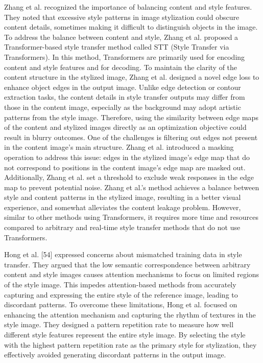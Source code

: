 Zhang et al.\citep{53zhang2023edge} recognized the importance of balancing content and style features. They noted that excessive style patterns in image stylization could obscure content details, sometimes making it difficult to distinguish objects in the image. To address the balance between content and style, Zhang et al. proposed a Transformer-based style transfer method called STT (Style Transfer via Transformers). In this method, Transformers are primarily used for encoding content and style features and for decoding. To maintain the clarity of the content structure in the stylized image, Zhang et al. designed a novel edge loss to enhance object edges in the output image. Unlike edge detection or contour extraction tasks, the content details in style transfer outputs may differ from those in the content image, especially as the background may adopt artistic patterns from the style image. Therefore, using the similarity between edge maps of the content and stylized images directly as an optimization objective could result in blurry outcomes. One of the challenges is filtering out edges not present in the content image's main structure. Zhang et al. introduced a masking operation to address this issue: edges in the stylized image's edge map that do not correspond to positions in the content image's edge map are masked out. Additionally, Zhang et al. set a threshold to exclude weak responses in the edge map to prevent potential noise. Zhang et al.’s method achieves a balance between style and content patterns in the stylized image, resulting in a better visual experience, and somewhat alleviates the content leakage problem. However, similar to other methods using Transformers, it requires more time and resources compared to arbitrary and real-time style transfer methods that do not use Transformers.

Hong et al. [54] expressed concerns about mismatched training data in style transfer. They argued that the low semantic correspondence between arbitrary content and style images causes attention mechanisms to focus on limited regions of the style image. This impedes attention-based methods from accurately capturing and expressing the entire style of the reference image, leading to discordant patterns. To overcome these limitations, Hong et al. focused on enhancing the attention mechanism and capturing the rhythm of textures in the style image. They designed a pattern repetition rate to measure how well different style features represent the entire style image. By selecting the style with the highest pattern repetition rate as the primary style for stylization, they effectively avoided generating discordant patterns in the output image. 


